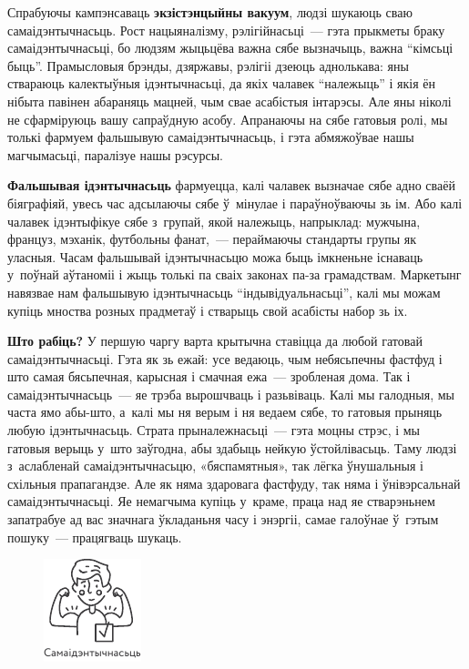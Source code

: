 
Спрабуючы кампэнсаваць \textbf{экзістэнцыйны вакуум}, людзі шукаюць сваю самаідэнтычнасьць. Рост нацыяналізму, рэлігійнасьці~--- гэта прыкметы браку самаідэнтычнасьці, бо людзям жыцьцёва важна сябе вызначыць, важна ``кімсьці быць''. Прамысловыя брэнды, дзяржавы, рэлігіі дзеюць аднолькава: яны ствараюць калектыўныя ідэнтычнасьці, да якіх чалавек ``належыць'' і якія ён нібыта павінен абараняць мацней, чым свае асабістыя інтарэсы. Але яны ніколі не сфарміруюць вашу сапраўдную асобу. Апранаючы на сябе гатовыя ролі, мы толькі фармуем фальшывую самаідэнтычнасьць, і гэта абмяжоўвае нашы магчымасьці, паралізуе нашы рэсурсы.

\textbf{Фальшывая ідэнтычнасьць} фармуецца, калі чалавек вызначае сябе адно сваёй біяграфіяй, увесь час адсылаючы сябе ў~мінулае і параўноўваючы зь ім. Або калі чалавек ідэнтыфікуе сябе з~групай, якой належыць, напрыклад: мужчына, француз, мэханік, футбольны фанат,~--- пераймаючы стандарты групы як уласныя. Часам фальшывай ідэнтычнасьцю можа быць імкненьне існаваць у~поўнай аўтаноміі і жыць толькі па сваіх законах па-за грамадствам. Маркетынг навязвае нам фальшывую ідэнтычнасьць ``індывідуальнасьці'', калі мы можам купіць мноства розных прадметаў і стварыць свой асабісты набор зь іх.

\textbf{Што рабіць?} У першую чаргу варта крытычна ставіцца да любой гатовай самаідэнтычнасьці. Гэта як зь ежай: усе ведаюць, чым небясьпечны фастфуд і што самая бясьпечная, карысная і смачная ежа~--- зробленая дома. Так і самаідэнтычнасьць~--- яе трэба вырошчваць і разьвіваць. Калі мы галодныя, мы часта ямо абы-што, а~калі мы ня верым і ня ведаем сябе, то гатовыя прыняць любую ідэнтычнасьць. Страта прыналежнасьці~--- гэта моцны стрэс, і мы гатовыя верыць у~што заўгодна, абы здабыць нейкую ўстойлівасьць. Таму людзі з~аслабленай самаідэнтычнасьцю, «бяспамятныя», так лёгка ўнушальныя і схільныя прапагандзе. Але як няма здаровага фастфуду, так няма і ўнівэрсальнай самаідэнтычнасьці. Яе немагчыма купіць у~краме, праца над яе стварэньнем запатрабуе ад вас значнага ўкладаньня часу і энэргіі, самае галоўнае ў~гэтым пошуку~--- працягваць шукаць.

\begin{figure}[htb!]
  \centering
  \includegraphics[scale=1.5]{willpower/ch9/12.pdf}
\end{figure}


